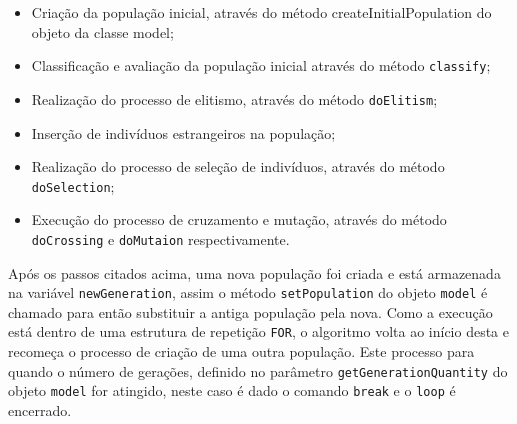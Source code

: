 \begin{itemize}
	\begin{itemize}
		\item	Criação da população inicial, através do método createInitialPopulation
		do objeto da classe model;
		
		\item Classificação e avaliação da população inicial através do método
		\texttt{classify};
		
		\item Realização do processo de elitismo, através do método
		\texttt{doElitism};
		
		\item Inserção de indivíduos estrangeiros na população;
		
		\item Realização do processo de seleção de indivíduos, através do método
		\texttt{doSelection};
		
		\item Execução do processo de cruzamento e mutação, através do método
		\texttt{doCrossing} e \texttt{doMutaion} respectivamente.
		
		
	\end{itemize}
	
	\par Após os passos citados acima, uma nova população foi criada e está
	armazenada na variável \texttt{newGeneration}, assim o método
	\texttt{setPopulation} do objeto \texttt{model} é chamado para então substituir
	a antiga população pela nova. Como a execução está dentro de uma estrutura de repetição
	\texttt{FOR}, o algoritmo volta ao início desta e recomeça o processo de
	criação de uma outra população. Este processo para quando o número de gerações, 
	definido no parâmetro \texttt{getGenerationQuantity} do objeto \texttt{model}
	for atingido, neste caso é dado o comando \texttt{break} e o \texttt{loop} é encerrado.
	
	
	
	
\end{itemize}

